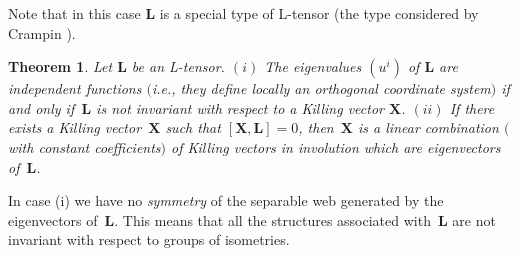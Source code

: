\documentclass[pdftex]{sigma}
\def\bs{\boldsymbol}
\numberwithin{equation}{section}
\newtheorem{Theorem}{Theorem}[section]
 { \theoremstyle{definition}
\newtheorem{Notation}[Theorem]{Notation}
\newtheorem{Example}[Theorem]{Example}
\newtheorem{Remark}[Theorem]{Remark}
\newtheorem{Remarks}[Theorem]{Remarks}
 }
\begin{document}
Note that in this case $\bs L$ is a special type of L-tensor (the type considered by Crampin \cite{Crampin-2003a,Crampin-2003b}).

\begin{Theorem}\label{t:9.2}
Let $\bs L$ be an L-tensor. $(i)$  The eigenvalues $(u^i)$ of $\bs L$ are independent functions $($i.e., they def\/ine locally an orthogonal coordinate system$)$ if and only if~$\bs L$ is  not invariant with respect to  a Killing vector $\bs X$. $(ii)$ If there exists a Killing vector~$\bs X$ such that $[\bs X,\bs L]=0$, then~$\bs X$ is a linear combination $($with constant coefficients$)$ of Killing vectors in involution which are eigenvectors of~$\bs L$.
\end{Theorem}

In case (i) we have no {\it symmetry} of the separable web generated by the eigenvectors of~$\bs L$. This means that all the structures associated with~$\bs L$ are not invariant with respect to  groups of isometries.
\end{document}
